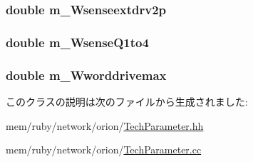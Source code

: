 \label{classTechParameter_aef6ad54e791f509d34749a3c7f18bac6}
\hypertarget{classTechParameter_a229e499fac1face8aea907a26ed74d9a}{
\subsubsection[{m\_\-Wsenseextdrv2p}]{\setlength{\rightskip}{0pt plus 5cm}double {\bf m\_\-Wsenseextdrv2p}}}
\label{classTechParameter_a229e499fac1face8aea907a26ed74d9a}
\hypertarget{classTechParameter_ac6cd382241dce37197dcb3245165c1a0}{
\subsubsection[{m\_\-WsenseQ1to4}]{\setlength{\rightskip}{0pt plus 5cm}double {\bf m\_\-WsenseQ1to4}}}
\label{classTechParameter_ac6cd382241dce37197dcb3245165c1a0}
\hypertarget{classTechParameter_a8ce9b55dd810721e13d7250d2e8ba486}{
\subsubsection[{m\_\-Wworddrivemax}]{\setlength{\rightskip}{0pt plus 5cm}double {\bf m\_\-Wworddrivemax}}}
\label{classTechParameter_a8ce9b55dd810721e13d7250d2e8ba486}


このクラスの説明は次のファイルから生成されました:\begin{DoxyCompactItemize}
\item 
mem/ruby/network/orion/\hyperlink{TechParameter_8hh}{TechParameter.hh}\item 
mem/ruby/network/orion/\hyperlink{TechParameter_8cc}{TechParameter.cc}\end{DoxyCompactItemize}
